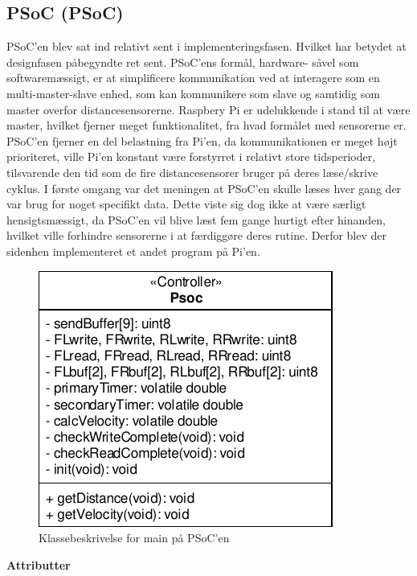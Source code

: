 \subsection{PSoC (PSoC)} \label{sec:sw_design_psoc_psoc}

PSoC'en blev sat ind relativt sent i implementeringsfasen. Hvilket har betydet at designfasen påbegyndte ret sent.
PSoC'ens formål, hardware- såvel som softwaremæssigt, er at simplificere \IIC kommunikation ved at interagere som en multi-master-slave enhed, som kan kommunikere som \IIC slave og samtidig som \IIC master overfor distancesensorerne. Raspbery Pi er udelukkende i stand til at være master, hvilket fjerner meget funktionalitet, fra hvad formålet med sensorerne er. PSoC'en fjerner en del belastning fra Pi'en, da \IIC kommunikationen er meget højt prioriteret, ville Pi'en konstant være forstyrret i relativt store tidsperioder, tilsvarende den tid som de fire distancesensorer bruger på deres læse/skrive cyklus. I første omgang var det meningen at PSoC'en skulle læses hver gang der var brug for noget specifikt data. Dette viste sig dog ikke at være særligt hensigtsmæssigt, da PSoC'en vil blive læst fem gange hurtigt efter hinanden, hvilket ville forhindre sensorerne i at færdiggøre deres rutine. Derfor blev der sidenhen implementeret et andet program på Pi'en. 

\begin{figure}[h]
\centering
\includegraphics[]{../fig/diagrammer/psoc/cd_psoc.pdf}
\caption{Klassebeskrivelse for main på PSoC'en}
\label{fig:cd_main_psoc}
\end{figure}

\clearpage

\textbf{Attributter}

